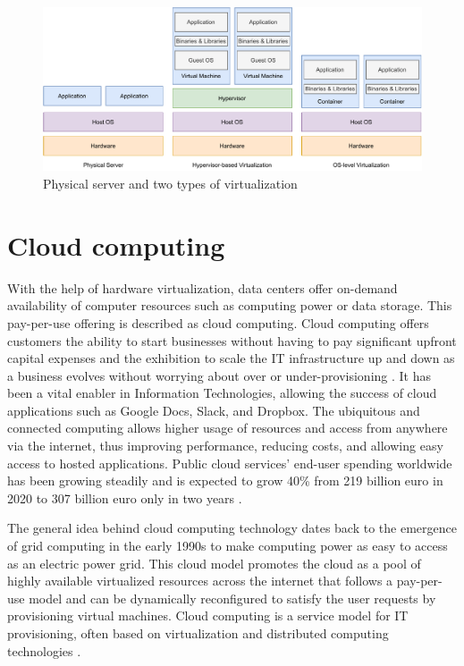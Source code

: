 \begin{figure}[ht]
  \begin{center}
    \includegraphics[width=13.5cm]{images/VirtualizationTypes.pdf}
    \caption{Physical server and two types of virtualization}
    \label{fig:VirtualizationTypes}
  \end{center}
\end{figure}

\section{Cloud computing}

With the help of hardware virtualization, data centers offer on-demand availability of computer resources such as computing power or data storage. This pay-per-use offering is described as cloud computing. Cloud computing offers customers the ability to start businesses without having to pay significant upfront capital expenses and the exhibition to scale the IT infrastructure up and down as a business evolves without worrying about over or under-provisioning \cite{Toimela2017}\cite{Xing2012}. It has been a vital enabler in Information Technologies, allowing the success of cloud applications such as Google Docs, Slack, and Dropbox. The ubiquitous and connected computing allows higher usage of resources and access from anywhere via the internet, thus improving performance, reducing costs, and allowing easy access to hosted applications. Public cloud services' end-user spending worldwide has been growing steadily and is expected to grow 40\% from 219 billion euro in 2020 to 307 billion euro only in two years \cite{PublicCloudStatista}.

The general idea behind cloud computing technology dates back to the emergence of grid computing in the early 1990s to make computing power as easy to access as an electric power grid. This cloud model promotes the cloud as a pool of highly available virtualized resources across the internet that follows a pay-per-use model and can be dynamically reconfigured to satisfy the user requests by provisioning virtual machines. Cloud computing is a service model for IT provisioning, often based on virtualization and distributed computing technologies \cite{Lombardi2011}. \cite{Xing2012}

